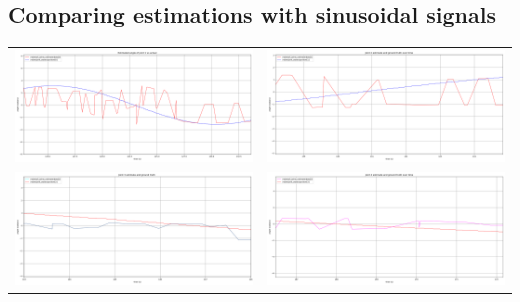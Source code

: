 \subsection{Comparing estimations with sinusoidal signals}
\begin{tabular}{c c}
    \includegraphics[width=0.5\linewidth]{plots/joint1_q4.png} &
    \includegraphics[width=0.5\linewidth]{plots/joint2_q4.png} \\
    \includegraphics[width=0.5\linewidth]{plots/joint3_q4.png} &
    \includegraphics[width=0.5\linewidth]{plots/joint4_q4.png}
\end{tabular}
